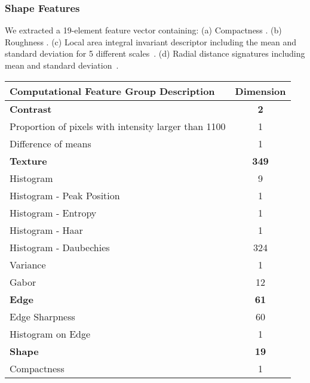 \subsubsection{Shape Features}
We extracted a 19-element feature vector containing: (a) Compactness \cite{Duda:1973ul}.
(b) Roughness \cite{Kilday:1993jk}.
(c) Local area integral invariant descriptor including the mean and standard deviation for 5 different scales~\cite{Hong:2006ti,Manay:2006un}.
(d) Radial distance signatures including mean and standard deviation~\cite{MRangayyan:2005td}.

\begin{table}
	\centering
	\begin{tabular}{|l|c|}
		\hline
		Computational Feature Group Description & Dimension \\ \hline \hline
		\textbf{Contrast} & \textbf{2} \\ \hline
		\hspace{2pt} Proportion of pixels with intensity larger than 1100 & 1 \\ \hline
		\hspace{2pt} Difference of means & 1 \\ \hline
		\textbf{Texture} & \textbf{349} \\ \hline
		\hspace{2pt} Histogram & 9 \\ \hline
		\hspace{2pt} Histogram - Peak Position & 1 \\ \hline
		\hspace{2pt} Histogram - Entropy & 1 \\ \hline
		\hspace{2pt} Histogram - Haar & 1 \\ \hline
		\hspace{2pt} Histogram - Daubechies & 324 \\ \hline
		\hspace{2pt} Variance & 1 \\ \hline
		\hspace{2pt} Gabor & 12 \\ \hline
		\textbf{Edge} & \textbf{61} \\ \hline
		\hspace{2pt} Edge Sharpness & 60 \\ \hline
		\hspace{2pt} Histogram on Edge & 1 \\ \hline
		\textbf{Shape} & \textbf{19} \\ \hline
		\hspace{2pt} Compactness & 1 \\ \hline

\end{tabular}
\end{table}
